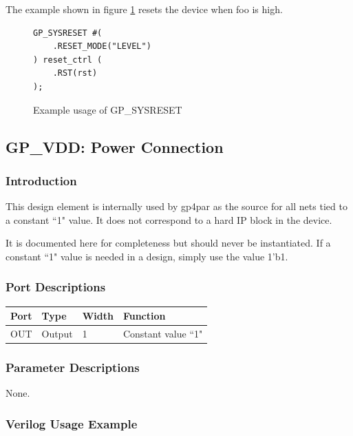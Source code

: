 \documentclass{article}
\begin{document}
The example shown in figure \ref{gp-sysreset-example} resets the device when foo is high.

\begin{figure}[h]
\begin{lstlisting}
GP_SYSRESET #(
	.RESET_MODE("LEVEL")
) reset_ctrl (
	.RST(rst)
);
\end{lstlisting}
\caption{Example usage of GP\_SYSRESET}
\label{gp-sysreset-example}
\end{figure}


\FloatBarrier
\pagebreak
\subsection{GP\_VDD: Power Connection}

\subsubsection{Introduction}
This design element is internally used by gp4par as the source for all nets tied to a constant ``1" value. It does not 
correspond to a hard IP block in the device.

It is documented here for completeness but should never be instantiated. If a constant ``1" value is needed in a 
design, simply use the value 1'b1.

\subsubsection{Port Descriptions}

\begin{tabularx}{4in}{|l|l|l|X|}
\hline
{\bfseries Port} & {\bfseries Type} & {\bfseries Width} & {\bfseries Function} \\
\hline
OUT & Output & 1 & Constant value ``1" \\
\hline
\end{tabularx}

\subsubsection{Parameter Descriptions}

None.

\subsubsection{Verilog Usage Example}
\end{document}
